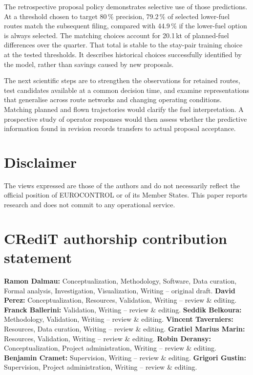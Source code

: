 \documentclass[preprint,authoryear,12pt]{elsarticle}
\begin{document}
The retrospective proposal policy demonstrates selective use of those
predictions. At a threshold chosen to target 80\,\% precision,
79.2\,\% of selected lower-fuel routes match the subsequent filing,
compared with 44.9\,\% if the lower-fuel option is always selected.
The matching choices account for 20.1\,kt of planned-fuel differences
over the quarter. That total is stable to the stay-pair training choice
at the tested thresholds. It describes historical choices successfully
identified by the model, rather than savings caused by new proposals.

The next scientific steps are to strengthen the observations for
retained routes, test candidates available at a common decision time,
and examine representations that generalise across route networks and
changing operating conditions. Matching planned and flown trajectories
would clarify the fuel interpretation. A prospective study of operator
responses would then assess whether the predictive information found
in revision records transfers to actual proposal acceptance.

\section*{Disclaimer}
The views expressed are those of the authors and do not necessarily
reflect the official position of EUROCONTROL or of its Member States.
This paper reports research and does not commit to any operational
service.

\section*{CRediT authorship contribution statement}
\textbf{Ramon Dalmau:} Conceptualization, Methodology, Software, Data
curation, Formal analysis, Investigation, Visualization, Writing --
original draft. \textbf{David Perez:} Conceptualization, Resources,
Validation, Writing -- review \& editing. \textbf{Franck Ballerini:}
Validation, Writing -- review \& editing. \textbf{Seddik Belkoura:}
Methodology, Validation, Writing -- review \& editing.
\textbf{Vincent Taverniers:} Resources, Data curation, Writing --
review \& editing. \textbf{Gratiel Marius Marin:} Resources,
Validation, Writing -- review \& editing. \textbf{Robin Deransy:} Conceptualization, Project
administration, Writing -- review \& editing. \textbf{Benjamin
Cramet:} Supervision, Writing -- review \& editing. \textbf{Grigori
Gustin:} Supervision, Project administration, Writing -- review \&
editing.
\end{document}
